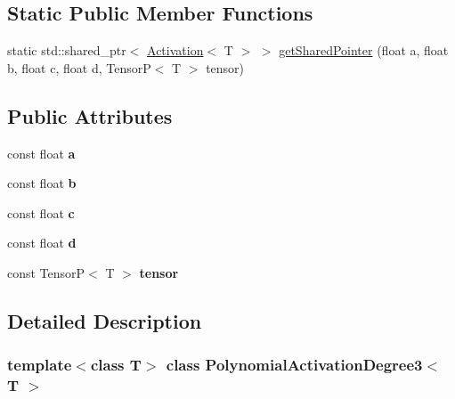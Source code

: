 \subsection*{Static Public Member Functions}
\begin{DoxyCompactItemize}
\item 
static std\+::shared\+\_\+ptr$<$ \hyperlink{classActivation}{Activation}$<$ T $>$ $>$ \hyperlink{classPolynomialActivationDegree3_a667e6e63f1e9e1028facf857c04a6019}{get\+Shared\+Pointer} (float a, float b, float c, float d, TensorP$<$ T $>$ tensor)
\end{DoxyCompactItemize}
\subsection*{Public Attributes}
\begin{DoxyCompactItemize}
\item 
\mbox{\label{classPolynomialActivationDegree3_a2ed1e474229c9f6bf0b1791fe75ca3b4}} 
const float {\bfseries a}
\item 
\mbox{\label{classPolynomialActivationDegree3_a50bcd410ee516d8ef35e9512960d2ccf}} 
const float {\bfseries b}
\item 
\mbox{\label{classPolynomialActivationDegree3_ade9d3561fffbb4222c196a1c69773050}} 
const float {\bfseries c}
\item 
\mbox{\label{classPolynomialActivationDegree3_ae02f7b6ba9b5730a8e8263159d123407}} 
const float {\bfseries d}
\item 
\mbox{\label{classPolynomialActivationDegree3_a6c17ea9b87ea3ec83450d39e552a1a7d}} 
const TensorP$<$ T $>$ {\bfseries tensor}
\end{DoxyCompactItemize}


\subsection{Detailed Description}
\subsubsection*{template$<$class T$>$\newline
class Polynomial\+Activation\+Degree3$<$ T $>$}

